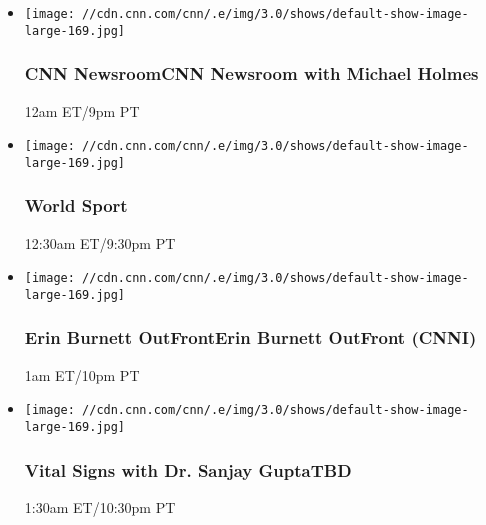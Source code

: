 \begin{itemize}
\item
  \texttt{[image: //cdn.cnn.com/cnn/.e/img/3.0/shows/default-show-image-large-169.jpg]}

  \hypertarget{cnn-newsroomcnn-newsroom-with-michael-holmes--3}{%
  \subsubsection{CNN NewsroomCNN Newsroom with Michael Holmes
  }\label{cnn-newsroomcnn-newsroom-with-michael-holmes--3}}

  12am ET/9pm PT
\end{itemize}

\begin{itemize}
\item
  \texttt{[image: //cdn.cnn.com/cnn/.e/img/3.0/shows/default-show-image-large-169.jpg]}

  \hypertarget{world-sport-20}{%
  \subsubsection{World Sport}\label{world-sport-20}}

  12:30am ET/9:30pm PT
\end{itemize}

\begin{itemize}
\item
  \texttt{[image: //cdn.cnn.com/cnn/.e/img/3.0/shows/default-show-image-large-169.jpg]}

  \hypertarget{erin-burnett-outfronterin-burnett-outfront-cnni--5}{%
  \subsubsection{Erin Burnett OutFrontErin Burnett OutFront (CNNI)
  }\label{erin-burnett-outfronterin-burnett-outfront-cnni--5}}

  1am ET/10pm PT
\end{itemize}

\begin{itemize}
\item
  \texttt{[image: //cdn.cnn.com/cnn/.e/img/3.0/shows/default-show-image-large-169.jpg]}

  \hypertarget{vital-signs-with-dr-sanjay-guptatbd--6}{%
  \subsubsection{Vital Signs with Dr. Sanjay GuptaTBD
  }\label{vital-signs-with-dr-sanjay-guptatbd--6}}

  1:30am ET/10:30pm PT
\end{itemize}

